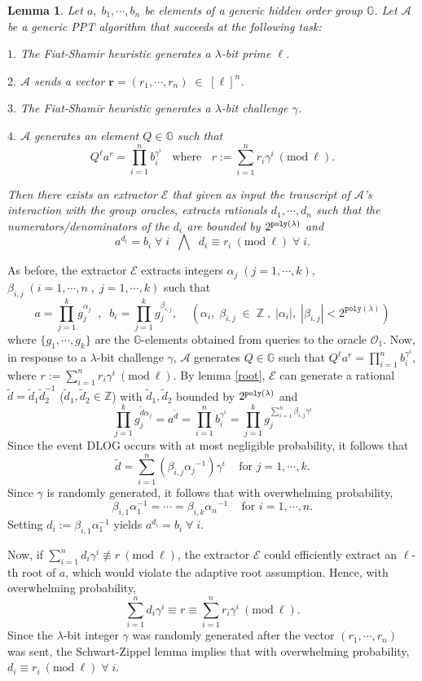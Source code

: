 \documentclass[11pt, lettersize, notitlepage, leqno, footskip=0.6cm]{article}
\newcommand{\bz}{\mathbb Z}
\newcommand{\pl}{\prod\limits}
\newcommand{\slim}{\sum\limits}
\newcommand{\ttt}{\texttt}
\newcommand{\bG}{\mathbb{G}}
\newcommand{\wti}{\widetilde}
\newcommand{\mc}{\mathcal}
\newcommand{\mb}{\mathbb}
\newcommand{\mbf}{\mathbf}
\newcommand{\al}{\alpha}
\newcommand{\be}{\beta}
\newcommand{\lam}{\lambda}
\newcommand{\A}{\mc{A}}
\newcommand{\vs}{\vspace{-0.15cm}}
\newcommand{\noin}{\noindent}
\newcommand{\op}{overwhelming probability}
\newcommand{\np}{negligible probability}
\newcommand{\Mod}[1]{\ (\mathrm{mod}\ #1)}
\newcommand{\E}{\mc{E}}
\newtheorem{Lem}[Thm]{Lemma}
\numberwithin{equation}{section}
\begin{document}
\begin{Lem} \label{aggroot} Let $a,\; b_1,\cdots,b_n$ be elements of a generic hidden order group $\bG$. Let $\mc{A}$ be a generic PPT algorithm that succeeds at the following task:

\noin $1.$ The Fiat-Shamir heuristic generates a $\lam$-bit prime $\ell$.

\noin $2.$ $\mc{A}$ sends a vector $\mbf{r} = (r_1,\cdots,r_n)\;\in\; [\ell]^n$.

\noin $3.$ The Fiat-Shamir heuristic generates a $\lam$-bit challenge $\gamma$.

\noin $4.$ $\mc{A}$ generates an element $Q\in \mb{G}$ such that \vs $$Q^{\ell}a^r = \pl_{i=1}^n b_i^{\gamma^i}\;\;\text{ where }\;\; r:= \slim_{i=1}^n r_i\gamma^i\Mod{\ell}.$$

\noin Then there exists an extractor \hspace{0.05cm}$\E$ that given as input the transcript of $\A$'s interaction with the group oracles, extracts rationals $d_1,\cdots,d_n$ such that the numerators/denominators of the $d_i$ are bounded by $2^{\tt{poly}(\lam)}$ and \vs $$a^{d_i} = b_i \;\forall\;i \;\;\bigwedge\;\; d_i\equiv r_i\Mod{\ell}\;\forall\;i.$$ \end{Lem}

\begin{prf} As before, the extractor $\E$ extracts integers $\al_j\;(j=1,\cdots,k)$, $\be_{i,j}\;(i=1,\cdots, n\;,\;j= 1,\cdots,k)$ such that \vs $$a = \pl_{j=1}^k g_j^{\al_j}\;\;,\;\; b_i = \pl_{j=1}^k g_j^{\be_{i,j}},\;\;\;\;(\al_i,\;\be_{i,j}\;\in\;\bz\;,\;|\al_i|,\;|\be_{i,j}| < 2^{\ttt{poly}(\lam)})$$ where $\{g_1,\cdots,g_k\}$ are the $\bG$-elements obtained from queries to the oracle $\mc{O}_1$. Now, in response to a $\lam$-bit challenge $\gamma$, $\mc{A}$ generates $Q\in\bG$ such that $Q^{\ell}a^r = \pl_{i=1}^n b_i^{\gamma^i}, $ where $r:= \slim_{i=1}^n r_i{\gamma}^i\Mod{\ell}$. By lemma \ref{root}, $\E$ can generate a rational $\wti{d} = \wti{d}_1\wti{d}_2^{-1}$ ($\wti{d}_1, \wti{d}_2\in\bz$) with $\wti{d}_1, \wti{d}_2$ bounded by $2^{\tt{poly}(\lam)}$ and \vs $$\pl_{j=1}^k g_j^{\wti{d}\al_j} = a^{\wti{d}} = \pl_{i=1}^n b_i^{\gamma^i} = \pl_{j=1}^k g_j^{\slim_{i=1}^n \be_{i,j}\gamma^i}$$ Since the event DLOG occurs with at most \np, it follows that \vs $$ \wti{d} = \slim_{i=1}^n ({\be_{i,j}}{\al_j}^{-1})\gamma^i\;\;\;\text{ for } j = 1,\cdots, k.$$ Since $\gamma$ is randomly generated, it follows that with \op, \vs $$\be_{i,1}\al_{1}^{-1} = \cdots =  \be_{i,k}{\al_{n}}^{-1}\;\;\;\text{ for } i = 1,\cdots, n.$$ Setting $d_i:= \be_{i,1}\al_{1}^{-1}$ yields $a^{d_i} = b_i\;\forall\; i$.

Now, if $\slim_{i=1}^n d_i\gamma^i \not\equiv r\Mod{\ell}$, the extractor $\E$ could efficiently extract an $\ell$-th root of $a$, which would violate the adaptive root assumption. Hence, with \op, \vs $$\slim_{i=1}^n d_i\gamma^i \equiv r\equiv \slim_{i=1}^n r_i\gamma^i \Mod{\ell}.$$ Since the $\lam$-bit integer $\gamma$ was randomly generated after the vector $(r_1,\cdots,r_n)$ was sent, the Schwart-Zippel lemma implies that with \op, $d_i\equiv r_i\Mod{\ell}\;\forall\; i$.\end{prf}
\end{document}
